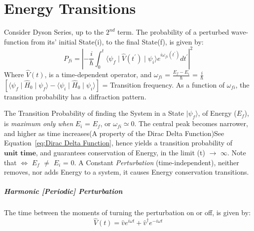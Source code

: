 \documentclass[a4paper, 10pt, onepage]{elegantbook}
\begin{document}
{\newpage

\chapter{Energy Transitions}

Consider Dyson Series, up to the $2^{nd}$ term. The probability of a perturbed wave-function from its' initial 
State(i), to the final State(f), is given by:
\begin{equation}
P_{fi} = \left| - \frac{i}{\hbar} \int_{0}^t \langle \psi_f \mid \hat V (t^{\prime}) \mid \psi_i \rangle e^{i 
\omega_{fi} (t^{\prime})} dt^{\prime} \right|^2
\end{equation}
Where $\hat V(t)$, is a time-dependent operator, and $\omega_{fi}$ = $\frac{E_f -  E_i}{\hbar}$ = $\frac{i}{\hbar}$ 
$\left[\langle \psi_f \mid \hat H_0 \mid \psi_f \rangle - \langle \psi_i \mid \hat H_0 \mid \psi_i \rangle \right]$ = 
Transition frequency. As a function of $\omega_{fi}$, the transition probability has a diffraction pattern.

The Transition Probability of finding the System in a State $\mid \psi_f \rangle$, of Energy ($E_f$), is \emph{maximum 
only when} $E_i$ = $E_f$, or $\omega_{fi} \simeq 0$. The central peak becomes narrower, and higher as time increases(A 
property of the Dirac Delta Function)See Equation~\ref{eq:Dirac Delta Function}, hence yields a transition probability 
of $\mathbf{\textbf{unit time}}$, and guarantees conservation of Energy, in the limit (t) $\rightarrow$ $\infty$. Note 
that $\iff$ $E_f$ $\neq$ $E_i$ = $0$. A Constant \emph{Perturbation} (time-independent), neither 
removes, nor adds Energy to a system, it causes Energy conservation transitions.



\paragraph{Harmonic [Periodic] Perturbation}

\medskip

The time between the moments of turning the perturbation on or off, is given by:
\begin{equation}
\hat V (t) = \hat v e^{i \omega t} + \hat v^{\dagger} e^{ - i \omega t}
\end{equation}

}
\end{document}
